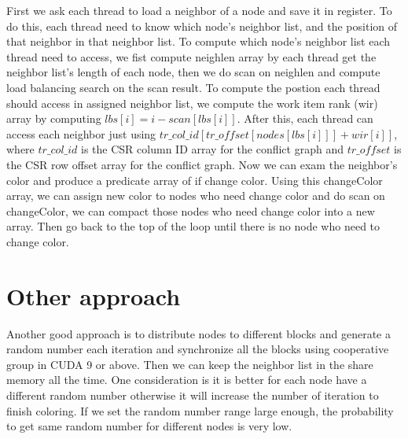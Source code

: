 \documentclass[12pt] {article}
\begin{document}
\begin{itemize}
First we ask each thread to load a neighbor of a node and save it in register. To do this, each thread need to know which node's neighbor list, and the position of that neighbor in that neighbor list. To compute which node's neighbor list each thread need to access, we fist compute neighlen array by each thread get the neighbor list's length of each node, then we do scan on neighlen and compute load balancing search on the scan result. To compute the postion each thread should access in assigned neighbor list, we compute the work item rank (wir) array by computing $lbs[i]=i-scan[lbs[i]]$. After this, each thread can access each neighbor just using $tr\_col\_id[tr\_offset[nodes[lbs[i]]] + wir[i]]$, where $tr\_col\_id$ is the CSR column ID array for the conflict graph and $tr\_offset$ is the CSR row offset array for the conflict graph. Now we can exam the neighbor's color and produce a predicate array of if change color. Using this changeColor array, we can assign new color to nodes who need change color and do scan on changeColor, we can compact those nodes who need change color into a new array. Then go back to the top of the loop until there is no node who need to change color.

\end{itemize}

\section{Other approach}
Another good approach is to distribute nodes to different blocks and generate a random number each iteration and synchronize all the blocks using cooperative group in CUDA 9 or above. Then we can keep the neighbor list in the share memory all the time. One consideration is it is better for each node have a different random number otherwise it will increase the number of iteration to finish coloring. If we set the random number range large enough, the probability to get same random number for different nodes is very low.
\end{document}
